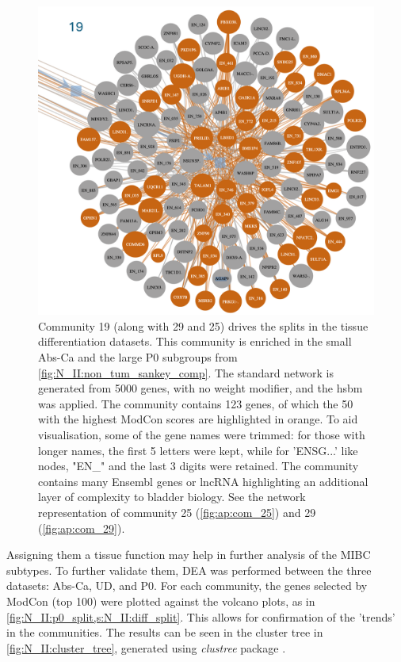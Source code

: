 \begin{figure}[H]    
    \centering
    \includegraphics[width=1.0\textwidth,height=1.0\textheight,keepaspectratio]{Sections/Network_II/resources/non_tum/19_com.png}
    \caption[Community 19]{Community 19 (along with 29 and 25) drives the splits in the tissue differentiation datasets. This community is enriched in the small Abs-Ca and the large P0 subgroups from \cref{fig:N_II:non_tum_sankey_comp}. The standard network is generated from 5000 genes, with no weight modifier, and the \acrshort{hsbm} was applied. The community contains 123 genes, of which the 50 with the highest ModCon scores are highlighted in orange. To aid visualisation, some of the gene names were trimmed: for those with longer names, the first 5 letters were kept, while for 'ENSG...' like nodes, "EN\_" and the last 3 digits were retained. The community contains many Ensembl genes or \acrshort{lncRNA} highlighting an additional layer of complexity to bladder biology. See the network representation of community 25 (\cref{fig:ap:com_25}) and 29 (\cref{fig:ap:com_29}).}
    \label{fig:N_II:19_com}
\end{figure}


Assigning them a tissue function may help in further analysis of the MIBC subtypes. To further validate them, DEA was performed between the three datasets: Abs-Ca, UD, and P0. For each community, the genes selected by ModCon (top 100) were plotted against the volcano plots, as in \cref{fig:N_II:p0_split,s:N_II:diff_split}. This allows for confirmation of the 'trends' in the communities. The results can be seen in the cluster tree in \cref{fig:N_II:cluster_tree}, generated using \textit{clustree} package \citep{Zappia2018-bt}.

